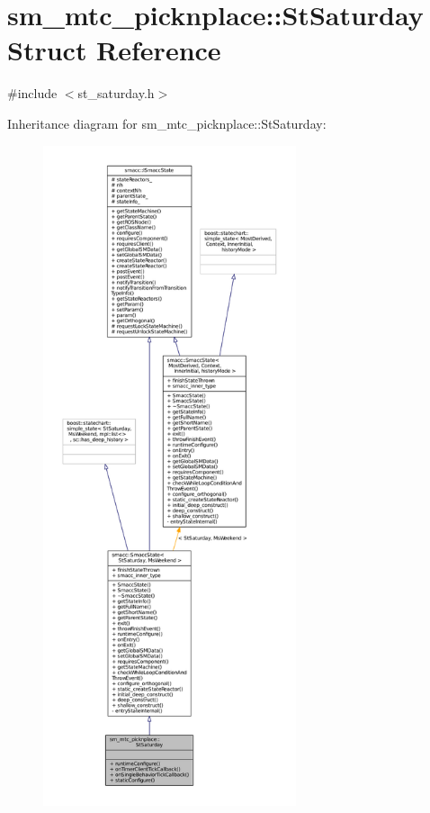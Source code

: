 \hypertarget{structsm__mtc__picknplace_1_1StSaturday}{}\section{sm\+\_\+mtc\+\_\+picknplace\+:\+:St\+Saturday Struct Reference}
\label{structsm__mtc__picknplace_1_1StSaturday}


{\ttfamily \#include $<$st\+\_\+saturday.\+h$>$}



Inheritance diagram for sm\+\_\+mtc\+\_\+picknplace\+:\+:St\+Saturday\+:
\nopagebreak
\begin{figure}[H]
\begin{center}
\leavevmode
\includegraphics[height=550pt]{structsm__mtc__picknplace_1_1StSaturday__inherit__graph}
\end{center}
\end{figure}


